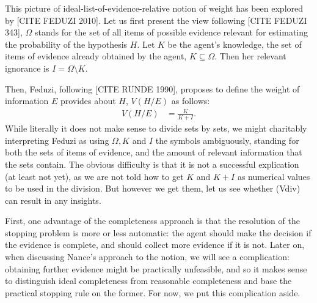 \documentclass[
  10pt,
  dvipsnames,enabledeprecatedfontcommands]{scrartcl}
\begin{document}
This picture of ideal-list-of-evidence-relative notion of weight has
been explored by {[}CITE FEDUZI 2010{]}.  Let us
first present the view following {[}CITE FEDUZI 343{]}, \(\Omega\)
stands for the set of all items of possible evidence relevant for
estimating the probability of the hypothesis \(H\). Let \(K\) be the
agent's knowledge, the set of items of evidence already obtained by the
agent, \(K \subseteq \Omega\). Then her relevant ignorance is
\(I = \Omega \setminus K\).

Then, Feduzi, following {[}CITE RUNDE 1990{]}, proposes to define the
weight of information \(E\) provides about \(H\), \(V(H/E)\) as follows:
\begin{align} \tag{Vdiv}  V(H/E) & = \frac{K}{K+I}.\end{align}
\noindent While literally it does not make sense to divide sets by sets,
we might charitably interpreting Feduzi as using \(\Omega, K\) and \(I\)
the symbols ambiguously, standing for both the sets of items of
evidence, and the amount of relevant information that the sets contain.
The obvious difficulty is that it is not a successful explication (at
least not yet), as we are not told how to get \(K\) and \(K+I\) as
numerical values to be used in the division. But however we get them,
let us see whether (Vdiv) can result in any insights.

First, one advantage of the completeness approach is that the resolution
of the stopping problem is more or less automatic: the agent should make
the decision if the evidence is complete, and should collect more
evidence if it is not. Later on, when discussing Nance's approach to the
notion, we will see a complication: obtaining further evidence might be
practically unfeasible, and so it makes sense to distinguish ideal
completeness from reasonable completeness and base the practical
stopping rule on the former. For now, we put this complication aside.
\end{document}
